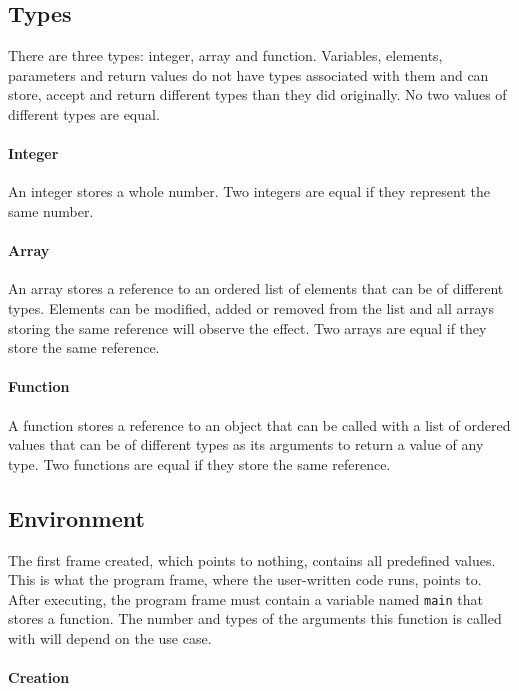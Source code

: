\subsection{Types}

There are three types: integer, array and function. Variables, elements, parameters and return values do not have types associated with them and can store, accept and return different types than they did originally. No two values of different types are equal.

\paragraph{Integer}

An integer stores a whole number. Two integers are equal if they represent the same number.

\paragraph{Array}

An array stores a reference to an ordered list of elements that can be of different types. Elements can be modified, added or removed from the list and all arrays storing the same reference will observe the effect. Two arrays are equal if they store the same reference.

\paragraph{Function}

A function stores a reference to an object that can be called with a list of ordered values that can be of different types as its arguments to return a value of any type. Two functions are equal if they store the same reference.

\subsection{Environment}

The first frame created, which points to nothing, contains all predefined values. This is what the program frame, where the user-written code runs, points to. After executing, the program frame must contain a variable named \verb|main| that stores a function. The number and types of the arguments this function is called with will depend on the use case.

\paragraph{Creation}

